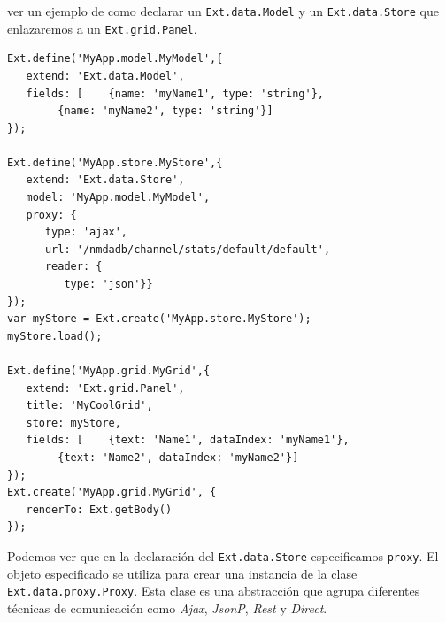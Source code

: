 	ver un ejemplo de como declarar un \texttt{Ext.data.Model} y un \texttt{Ext.data.Store} que enlazaremos a un \texttt{Ext.grid.Panel}.
	\begin{lstlisting}[style=myJs]
Ext.define('MyApp.model.MyModel',{
   extend: 'Ext.data.Model',
   fields: [	{name: 'myName1', type: 'string'},
   		{name: 'myName2', type: 'string'}]
});

Ext.define('MyApp.store.MyStore',{
   extend: 'Ext.data.Store',
   model: 'MyApp.model.MyModel',
   proxy: {
      type: 'ajax',
      url: '/nmdadb/channel/stats/default/default',
      reader: {
         type: 'json'}}
});
var myStore = Ext.create('MyApp.store.MyStore');
myStore.load();

Ext.define('MyApp.grid.MyGrid',{
   extend: 'Ext.grid.Panel',
   title: 'MyCoolGrid',
   store: myStore,
   fields: [	{text: 'Name1', dataIndex: 'myName1'},
		{text: 'Name2', dataIndex: 'myName2'}]
});
Ext.create('MyApp.grid.MyGrid', {
   renderTo: Ext.getBody()
});
	\end{lstlisting}
	\par
	Podemos ver que en la declaración del \texttt{Ext.data.Store} especificamos \texttt{proxy}. El objeto especificado se utiliza para crear una
	instancia de la clase \texttt{Ext.data.proxy.Proxy}. Esta clase es una abstracción que agrupa diferentes técnicas de comunicación como
	\emph{Ajax}, \emph{JsonP}, \emph{Rest} y \emph{Direct}.

